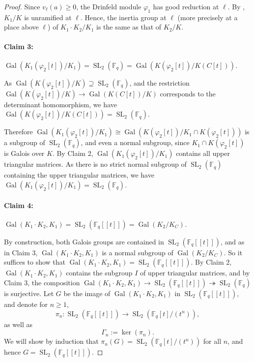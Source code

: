 \documentclass[10pt,a4paper]{amsart}
\theoremstyle{plain} %
\theoremstyle{definition}
\theoremstyle{remark}
\newcommand{\FF}{\mathbb{F}}
\newcommand{\Ker}{\operatorname{ker}}
\newcommand{\Fq}{\FF_{\!q}}  %
\newcommand{\Gal}{\operatorname{Gal}}
\newcommand{\SL}{\operatorname{SL}}
\newcommand{\ps}[1]{[\![#1]\!]}  %
\numberwithin{equation}{subsection}
\begin{document}
\begin{proof}
\medskip

Since $v_\ell(a)\geq 0$, the Drinfeld module $\varphi_1$ has good reduction at $\ell$. By \cite[Theorem 6.3.1]{mp:dm}, $K_1/K$ is unramified at $\ell$. Hence, the inertia group at $\ell$ (more precisely at a place above $\ell$) of $K_1\cdot K_2/K_1$ is the same as that of $K_2/K$.\\


\paragraph{Claim 3:} \emph{$\Gal(K_1(\varphi_2[t])/K_1)=\SL_2(\Fq)=\Gal(K(\varphi_2[t])/K(C[t]))$.}

\medskip

As $\Gal(K(\varphi_2[t])/K)\supseteq \SL_2(\Fq)$, and the restriction $\Gal(K(\varphi_2[t])/K)\to \Gal(K(C[t])/K)$ corresponds to the determinant homomorphism, we have $\Gal(K(\varphi_2[t])/K(C[t]))=\SL_2(\Fq)$.

Therefore $\Gal(K_1(\varphi_2[t])/K_1)\cong \Gal(K(\varphi_2[t])/K_1\cap K(\varphi_2[t]))$ is a subgroup of $\SL_2(\Fq)$, and even a normal subgroup, since $K_1\cap K(\varphi_2[t])$ is Galois over $K$. By Claim 2, $\Gal(K_1(\varphi_2[t])/K_1)$ contains all upper triangular matrices. As there is no strict normal subgroup of $\SL_2(\Fq)$ containing the upper triangular matrices, we have $\Gal(K_1(\varphi_2[t])/K_1)=\SL_2(\Fq)$.\\

\paragraph{Claim 4:} \emph{$\Gal(K_1\cdot K_2, K_1)=\SL_2(\Fq\ps{t})=\Gal(K_2/K_C)$.} 

\medskip

By construction, both Galois groups are contained in $\SL_2(\Fq\ps{t})$, and as in Claim 3, $\Gal(K_1\cdot K_2, K_1)$ is a normal subgroup of $\Gal(K_2/K_C)$. So it suffices to show that $\Gal(K_1\cdot K_2, K_1)=\SL_2(\Fq\ps{t})$.
By Claim 2, $\Gal(K_1\cdot K_2, K_1)$ contains the subgroup $I$ of upper triangular matrices, and by Claim 3, the composition $\Gal(K_1\cdot K_2, K_1)\to \SL_2(\Fq\ps{t})\twoheadrightarrow \SL_2(\Fq)$ is surjective.
Let $G$ be the image of $\Gal(K_1\cdot K_2, K_1)$ in $\SL_2(\Fq\ps{t})$, and denote for $n\geq 1$,
\[ \pi_n: \SL_2(\Fq\ps{t})\longrightarrow \SL_2(\Fq[t]/(t^n)),\]
as well as 
\[\Gamma_n:=\Ker(\pi_n). \]
We will show by induction that $\pi_n(G)=\SL_2(\Fq[t]/(t^n))$ for all $n$, and hence $G=\SL_2(\Fq\ps{t})$.


\end{proof}
\end{document}
